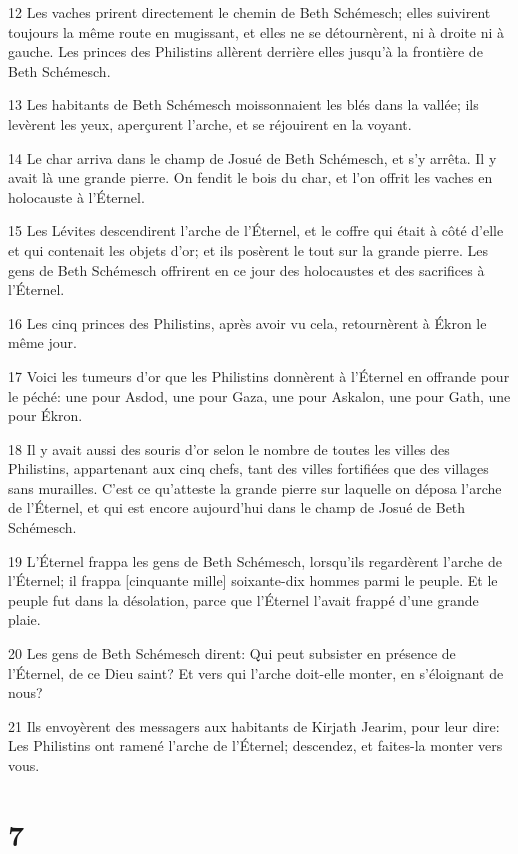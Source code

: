\par 12 Les vaches prirent directement le chemin de Beth Schémesch; elles suivirent toujours la même route en mugissant, et elles ne se détournèrent, ni à droite ni à gauche. Les princes des Philistins allèrent derrière elles jusqu'à la frontière de Beth Schémesch.
\par 13 Les habitants de Beth Schémesch moissonnaient les blés dans la vallée; ils levèrent les yeux, aperçurent l'arche, et se réjouirent en la voyant.
\par 14 Le char arriva dans le champ de Josué de Beth Schémesch, et s'y arrêta. Il y avait là une grande pierre. On fendit le bois du char, et l'on offrit les vaches en holocauste à l'Éternel.
\par 15 Les Lévites descendirent l'arche de l'Éternel, et le coffre qui était à côté d'elle et qui contenait les objets d'or; et ils posèrent le tout sur la grande pierre. Les gens de Beth Schémesch offrirent en ce jour des holocaustes et des sacrifices à l'Éternel.
\par 16 Les cinq princes des Philistins, après avoir vu cela, retournèrent à Ékron le même jour.
\par 17 Voici les tumeurs d'or que les Philistins donnèrent à l'Éternel en offrande pour le péché: une pour Asdod, une pour Gaza, une pour Askalon, une pour Gath, une pour Ékron.
\par 18 Il y avait aussi des souris d'or selon le nombre de toutes les villes des Philistins, appartenant aux cinq chefs, tant des villes fortifiées que des villages sans murailles. C'est ce qu'atteste la grande pierre sur laquelle on déposa l'arche de l'Éternel, et qui est encore aujourd'hui dans le champ de Josué de Beth Schémesch.
\par 19 L'Éternel frappa les gens de Beth Schémesch, lorsqu'ils regardèrent l'arche de l'Éternel; il frappa [cinquante mille] soixante-dix hommes parmi le peuple. Et le peuple fut dans la désolation, parce que l'Éternel l'avait frappé d'une grande plaie.
\par 20 Les gens de Beth Schémesch dirent: Qui peut subsister en présence de l'Éternel, de ce Dieu saint? Et vers qui l'arche doit-elle monter, en s'éloignant de nous?
\par 21 Ils envoyèrent des messagers aux habitants de Kirjath Jearim, pour leur dire: Les Philistins ont ramené l'arche de l'Éternel; descendez, et faites-la monter vers vous.

\chapter{7}

